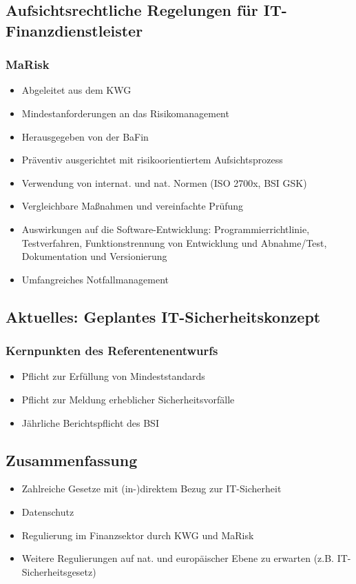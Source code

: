 \subsection{Aufsichtsrechtliche Regelungen für IT-Finanzdienstleister}

\subsubsection{MaRisk}
\begin{itemize}
	\item Abgeleitet aus dem KWG
	\item Mindestanforderungen an das Risikomanagement
	\item Herausgegeben von der BaFin
	\item Präventiv ausgerichtet mit risikoorientiertem Aufsichtsprozess
	\item Verwendung von internat. und nat. Normen (ISO 2700x, BSI GSK)
	\item Vergleichbare Maßnahmen und vereinfachte Prüfung
	\item Auswirkungen auf die Software-Entwicklung: Programmierrichtlinie, Testverfahren, Funktionstrennung von Entwicklung und Abnahme/Test, Dokumentation und Versionierung
	\item Umfangreiches Notfallmanagement
\end{itemize}


\subsection{Aktuelles: Geplantes IT-Sicherheitskonzept}

\subsubsection{Kernpunkten des Referentenentwurfs}
\begin{itemize}
	\item Pflicht zur Erfüllung von Mindeststandards
	\item Pflicht zur Meldung erheblicher Sicherheitsvorfälle
	\item Jährliche Berichtspflicht des BSI
\end{itemize}


\subsection{Zusammenfassung}
\begin{itemize}
	\item Zahlreiche Gesetze mit (in-)direktem Bezug zur IT-Sicherheit
	\item Datenschutz
	\item Regulierung im Finanzsektor durch KWG und MaRisk
	\item Weitere Regulierungen auf nat. und europäischer Ebene zu erwarten (z.B. IT-Sicherheitsgesetz)
\end{itemize}


